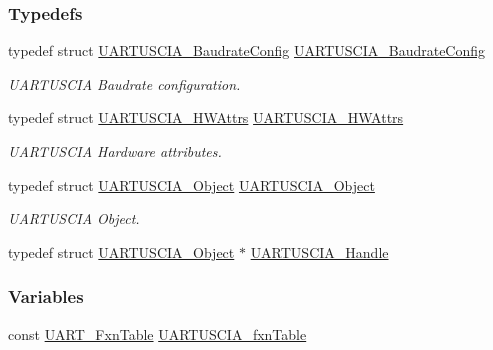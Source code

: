 \subsubsection*{Typedefs}
\begin{DoxyCompactItemize}
\item 
typedef struct \hyperlink{struct_u_a_r_t_u_s_c_i_a___baudrate_config}{U\+A\+R\+T\+U\+S\+C\+I\+A\+\_\+\+Baudrate\+Config} \hyperlink{_u_a_r_t_u_s_c_i_a_8h_a9dd05c71b8c01f08e0e7a3d244b979a5}{U\+A\+R\+T\+U\+S\+C\+I\+A\+\_\+\+Baudrate\+Config}
\begin{DoxyCompactList}\small\item\em U\+A\+R\+T\+U\+S\+C\+I\+A Baudrate configuration. \end{DoxyCompactList}\item 
typedef struct \hyperlink{struct_u_a_r_t_u_s_c_i_a___h_w_attrs}{U\+A\+R\+T\+U\+S\+C\+I\+A\+\_\+\+H\+W\+Attrs} \hyperlink{_u_a_r_t_u_s_c_i_a_8h_ae0df79ea0be8c2a982879d4ca96640b6}{U\+A\+R\+T\+U\+S\+C\+I\+A\+\_\+\+H\+W\+Attrs}
\begin{DoxyCompactList}\small\item\em U\+A\+R\+T\+U\+S\+C\+I\+A Hardware attributes. \end{DoxyCompactList}\item 
typedef struct \hyperlink{struct_u_a_r_t_u_s_c_i_a___object}{U\+A\+R\+T\+U\+S\+C\+I\+A\+\_\+\+Object} \hyperlink{_u_a_r_t_u_s_c_i_a_8h_ada23da6b4e4cb68cc02b428572a35039}{U\+A\+R\+T\+U\+S\+C\+I\+A\+\_\+\+Object}
\begin{DoxyCompactList}\small\item\em U\+A\+R\+T\+U\+S\+C\+I\+A Object. \end{DoxyCompactList}\item 
typedef struct \hyperlink{struct_u_a_r_t_u_s_c_i_a___object}{U\+A\+R\+T\+U\+S\+C\+I\+A\+\_\+\+Object} $\ast$ \hyperlink{_u_a_r_t_u_s_c_i_a_8h_a079d7343628e06c721baa22f08bdb5da}{U\+A\+R\+T\+U\+S\+C\+I\+A\+\_\+\+Handle}
\end{DoxyCompactItemize}
\subsubsection*{Variables}
\begin{DoxyCompactItemize}
\item 
const \hyperlink{struct_u_a_r_t___fxn_table}{U\+A\+R\+T\+\_\+\+Fxn\+Table} \hyperlink{_u_a_r_t_u_s_c_i_a_8h_a3ee66a5f5c9d9418c1aefea691f48c8a}{U\+A\+R\+T\+U\+S\+C\+I\+A\+\_\+fxn\+Table}
\end{DoxyCompactItemize}


